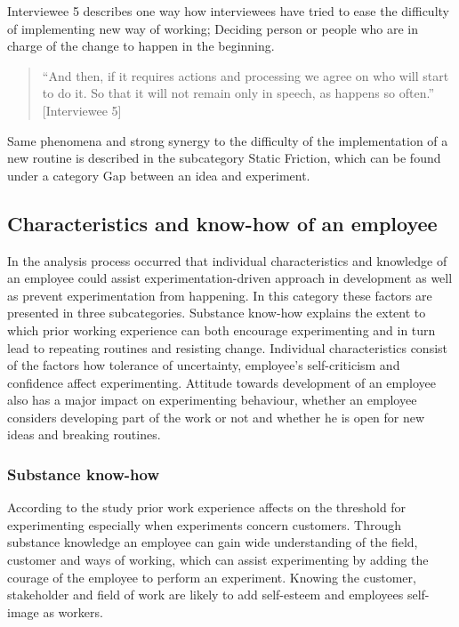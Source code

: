 Interviewee 5 describes one way how interviewees have tried to ease the difficulty of implementing new way of working; Deciding person or people who are in charge of the change to happen in the beginning. 
\begin{quote}
``And then, if it requires actions and processing we agree on who will start to do it. So that it will not remain only in speech, as happens so often.'' [Interviewee 5]
\end{quote}
Same phenomena and strong synergy to the difficulty of the implementation of a new routine is described in the subcategory Static Friction, which can be found under a category Gap between an idea and experiment. 

\subsection{Characteristics and know-how of an employee}
In the analysis process occurred that individual characteristics and knowledge of an employee could assist experimentation-driven approach in development as well as prevent experimentation from happening. In this category these factors are presented in three subcategories. Substance know-how explains the extent to which prior working experience can both encourage experimenting and in turn lead to repeating routines and resisting change. Individual characteristics consist of the factors how tolerance of uncertainty, employee's self-criticism and confidence affect experimenting. Attitude towards development of an employee also has a major impact on experimenting behaviour, whether an employee considers developing part of the work or not and whether he is open for new ideas and breaking routines. 

\subsubsection{Substance know-how}
According to the study prior work experience affects on the threshold for experimenting especially when experiments concern customers. Through substance knowledge an employee can gain wide understanding of the field, customer and ways of working, which can assist experimenting by adding the courage of the employee to perform an experiment. Knowing the customer, stakeholder and field of work are likely to add self-esteem and employees self-image as workers. 

